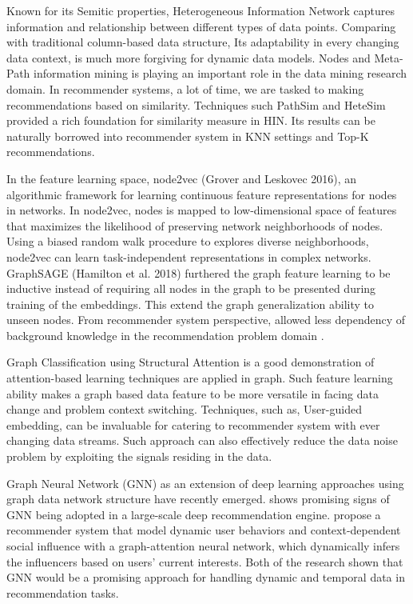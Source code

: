 Known for its Semitic properties, Heterogeneous Information Network captures information and relationship between different types of data points. Comparing with traditional column-based data structure, Its adaptability in every changing data context, is much more forgiving for dynamic data models. Nodes and Meta-Path information mining is playing an important role in the data mining research domain. In recommender systems, a lot of time, we are tasked to making recommendations based on similarity. Techniques such PathSim \citep{Sun2011PathSim} and HeteSim \citep{Shi2013HeteSim} provided a rich foundation for similarity measure in HIN. Its results can be naturally borrowed into recommender system in KNN settings and Top-K recommendations. 

In the feature learning space, node2vec (Grover and Leskovec 2016), an algorithmic framework for learning continuous feature representations for nodes in networks. In node2vec, nodes is mapped to low-dimensional space of features that maximizes the likelihood of preserving network neighborhoods of nodes. Using a biased random walk procedure to explores diverse neighborhoods, node2vec can learn task-independent representations in complex networks. GraphSAGE (Hamilton et al. 2018) furthered the graph feature learning to be inductive instead of requiring all nodes in the graph to be presented during training of the embeddings. This extend the graph generalization ability to unseen nodes. From recommender system perspective, allowed less dependency of background knowledge in the recommendation problem domain \citep{Hu2018}.  

Graph Classification using Structural Attention \citep{lee2018graph} is a good demonstration of attention-based learning techniques are applied in graph. Such feature learning ability makes a graph based data feature to be more versatile in facing data change and problem context switching. 
Techniques, such as, User-guided embedding, can be invaluable for catering to recommender system with ever changing data streams. Such approach can also effectively reduce the data noise problem by exploiting the signals residing in the data.  

Graph Neural Network (GNN) as an extension of deep learning approaches using graph data network structure have recently emerged. \citet{ying2018graph} shows promising signs of GNN being adopted in a large-scale deep recommendation engine. \citet{song2019session} propose a recommender system that model dynamic user behaviors and context-dependent social influence with a graph-attention neural network, which dynamically infers the influencers based on users’ current interests. Both of the research shown that GNN would be a promising approach for handling dynamic and temporal data in recommendation tasks.
